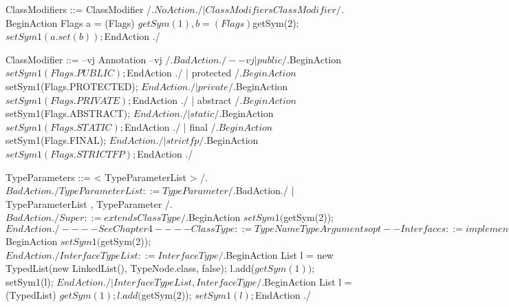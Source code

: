     ClassModifiers ::= ClassModifier
        /.$NoAction./
                     | ClassModifiers ClassModifier
        /.$BeginAction
                    Flags a = (Flags) $getSym(1),
                          b = (Flags) $getSym(2);
                    $setSym1(a.set(b));
          $EndAction
        ./

    ClassModifier ::= 
--vj Annotation
--vj        /.$BadAction./
--vj                    | 
                       public
        /.$BeginAction
                    $setSym1(Flags.PUBLIC);
          $EndAction
        ./
                    | protected
        /.$BeginAction
                    $setSym1(Flags.PROTECTED);
          $EndAction
        ./
                    | private
        /.$BeginAction
                    $setSym1(Flags.PRIVATE);
          $EndAction
        ./
                    | abstract
        /.$BeginAction
                    $setSym1(Flags.ABSTRACT);
          $EndAction
        ./
                    | static
        /.$BeginAction
                    $setSym1(Flags.STATIC);
          $EndAction
        ./
                    | final
        /.$BeginAction
                    $setSym1(Flags.FINAL);
          $EndAction
        ./
                    | strictfp
        /.$BeginAction
                    $setSym1(Flags.STRICTFP);
          $EndAction
        ./

    TypeParameters ::= < TypeParameterList >
        /.$BadAction./
    
    TypeParameterList ::= TypeParameter
        /.$BadAction./
                        | TypeParameterList , TypeParameter
        /.$BadAction./

    Super ::= extends ClassType
        /.$BeginAction
                    $setSym1($getSym(2));
          $EndAction
        ./

    --
    -- See Chapter 4
    --
    --ClassType ::= TypeName TypeArgumentsopt
    --
    Interfaces ::= implements InterfaceTypeList
        /.$BeginAction
                    $setSym1($getSym(2));
          $EndAction
        ./

    InterfaceTypeList ::= InterfaceType
        /.$BeginAction
                    List l = new TypedList(new LinkedList(), TypeNode.class, false);
                    l.add($getSym(1));
                    $setSym1(l);
          $EndAction
        ./
                        | InterfaceTypeList , InterfaceType
        /.$BeginAction
                    List l = (TypedList) $getSym(1);
                    l.add($getSym(2));
                    $setSym1(l);
          $EndAction
        ./

